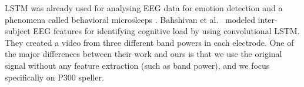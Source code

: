 \documentclass[
11pt, %
english, %
singlespacing, %
headsepline, %
]{MastersDoctoralThesis} %
\begin{document}
LSTM was already used for analysing EEG data for emotion detection \cite{soleymani2014continuous} and a phenomena called behavioral microsleeps \cite{davidson2005detecting}. Bahshivan et al.~\cite{LSTM_EEG} modeled inter-subject EEG features for identifying cognitive load by using convolutional LSTM. They created a video from three different band powers in each electrode. One of the major differences between their work and ours is that we use the original signal without any feature extraction (such as band power), and we focus specifically on P300 speller.



%
% 
%
% 
% 


\appendix %



%
%



\printbibliography[heading=bibintoc]

\end{document}
